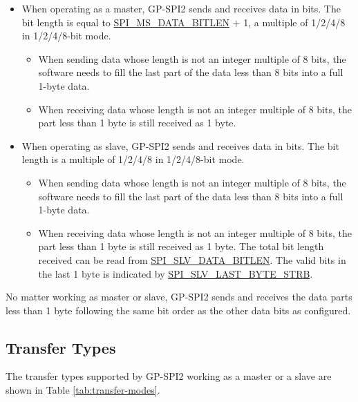 \documentclass[main\_\_EN.tex]{subfiles}
\begin{document}
\begin{itemize}
    \item When operating as a master, GP-SPI2 sends and receives data in bits. The bit length is equal to \hyperref[fielddesc:SPIMSDATABITLEN]{SPI\_MS\_DATA\_BITLEN} + 1, a multiple of 1/2/4/8 in 1/2/4/8-bit mode.
    \begin{itemize}
        \item When sending data whose length is not an integer multiple of 8 bits, the software needs to fill the last part of the data less than 8 bits into a full 1-byte data.
        \item When receiving data whose length is not an integer multiple of 8 bits, the part less than 1 byte is still received as 1 byte.
    \end{itemize}
    \item When operating as slave, GP-SPI2 sends and receives data in bits. The bit length is a multiple of 1/2/4/8 in 1/2/4/8-bit mode.
    \begin{itemize}
        \item When sending data whose length is not an integer multiple of 8 bits, the software needs to fill the last part of the data less than 8 bits into a full 1-byte data.
        \item When receiving data whose length is not an integer multiple of 8 bits, the part less than 1 byte is still received as 1 byte. The total bit length received can be read from \hyperref[fielddesc:SPISLVDATABITLEN]{SPI\_SLV\_DATA\_BITLEN}. The valid bits in the last 1 byte is indicated by \hyperref[fielddesc:SPISLVLASTBYTESTRB]{SPI\_SLV\_LAST\_BYTE\_STRB}.
    \end{itemize}
\end{itemize}

\begin{tiplisting}
No matter working as master or slave, GP-SPI2 sends and receives the data parts less than 1 byte following the same bit order as the other data bits as configured.
\end{tiplisting}
    
\subsection{Transfer Types}

The transfer types supported by GP-SPI2 working as a master or a slave are shown in Table \ref{tab:transfer-modes}.
\end{document}
